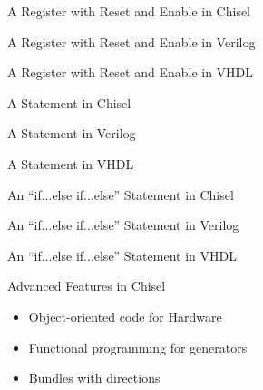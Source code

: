 \begin{frame}[fragile]{A Register with Reset and Enable in Chisel}
\end{frame}

\begin{frame}[fragile]{A Register with Reset and Enable in Verilog}
\end{frame}

\begin{frame}[fragile]{A Register with Reset and Enable in VHDL}
\end{frame}

\begin{frame}[fragile]{A  Statement in Chisel}
\end{frame}

\begin{frame}[fragile]{A  Statement in Verilog}
\end{frame}

\begin{frame}[fragile]{A  Statement in VHDL}
\end{frame}

\begin{frame}[fragile]{An ``if...else  if...else'' Statement in Chisel}
\end{frame}

\begin{frame}[fragile]{An ``if...else  if...else'' Statement in Verilog}
\end{frame}

\begin{frame}[fragile]{An ``if...else  if...else'' Statement in VHDL}
\end{frame}


\begin{frame}[fragile]{Advanced Features in Chisel}
\begin{itemize}
\item Object-oriented code for Hardware
\item Functional programming for generators
\item Bundles with directions
\end{itemize}
\end{frame}



